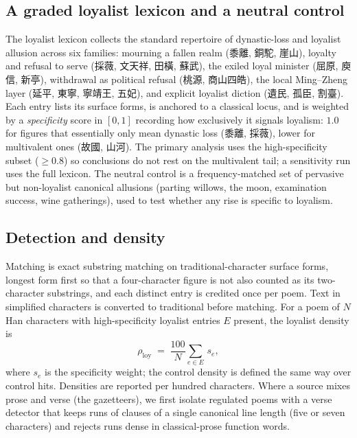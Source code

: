 \documentclass[10pt,twocolumn]{article}
\begin{document}
\subsection{A graded loyalist lexicon and a neutral control}
The loyalist lexicon collects the standard repertoire of dynastic-loss and loyalist allusion
across six families: mourning a fallen realm (\mbox{黍離}, \mbox{銅駝}, \mbox{崖山}),
loyalty and refusal to serve (\mbox{採薇}, \mbox{文天祥}, \mbox{田橫}, \mbox{蘇武}), the
exiled loyal minister (\mbox{屈原}, \mbox{庾信}, \mbox{新亭}), withdrawal as political refusal
(\mbox{桃源}, \mbox{商山四皓}), the local Ming--Zheng layer (\mbox{延平}, \mbox{東寧},
\mbox{寧靖王}, \mbox{五妃}), and explicit loyalist diction (\mbox{遺民}, \mbox{孤臣},
\mbox{割臺}). Each entry lists its surface forms, is anchored to a classical locus, and is
weighted by a \emph{specificity} score in $[0,1]$ recording how exclusively it signals
loyalism: $1.0$ for figures that essentially only mean dynastic loss (\mbox{黍離},
\mbox{採薇}), lower for multivalent ones (\mbox{故國}, \mbox{山河}). The primary analysis uses
the high-specificity subset ($\geq 0.8$) so conclusions do not rest on the multivalent tail;
a sensitivity run uses the full lexicon. The neutral control is a frequency-matched set of
pervasive but non-loyalist canonical allusions (parting willows, the moon, examination
success, wine gatherings), used to test whether any rise is specific to loyalism.

\subsection{Detection and density}
Matching is exact substring matching on traditional-character surface forms, longest form
first so that a four-character figure is not also counted as its two-character substrings,
and each distinct entry is credited once per poem. Text in simplified characters is converted
to traditional before matching. For a poem of $N$ Han characters with high-specificity
loyalist entries $E$ present, the loyalist density is
\[
\rho_{\text{loy}} \;=\; \frac{100}{N}\sum_{e\in E}\, s_e ,
\]
where $s_e$ is the specificity weight; the control density is defined the same way over
control hits. Densities are reported per hundred characters. Where a source mixes prose and
verse (the gazetteers), we first isolate regulated poems with a verse detector that keeps
runs of clauses of a single canonical line length (five or seven characters) and rejects
runs dense in classical-prose function words.
\end{document}
